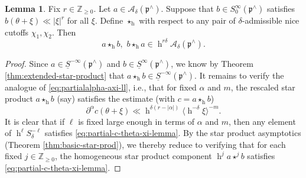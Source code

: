 \documentclass[reqno]{amsart}
\DeclareMathOperator{\h}{h}
\theoremstyle{plain} \newtheorem{theorem} {Theorem}
\theoremstyle{definition} \newtheorem{definition} [theorem] {Definition}
\theoremstyle{itplain} %
\newtheorem{lemma}[theorem]{Lemma}
\numberwithin{equation}{section}
\numberwithin{theorem}{section}
\renewcommand{\geq}{\geqslant}
\begin{document}
\begin{lemma}\label{lem:star-product-asymptotics-applied-to-cal-A-delta}
  Fix $r \in \mathbb{Z}_{\geq 0}$.  Let $a \in \mathcal{A}_\delta(\mathfrak{p}^\wedge)$.  Suppose that $b \in S^\infty_0(\mathfrak{p}^\wedge)$ satisfies $b(\theta + \xi) \ll |\xi|^r$ for all $\xi$.  Define $\star_{\h}$ with respect to any pair of $\delta$-admissible nice cutoffs $\chi_1, \chi_2$.  Then
  \begin{equation*}
    a \star_{\h} b, \, \, b \star_{\h} a \in \h^{r \delta} \mathcal{A}_\delta(\mathfrak{p}^\wedge).
  \end{equation*}
\end{lemma}
\begin{proof}
  Since $a \in \underline{S}^{-\infty}(\mathfrak{p}^\wedge)$ and $b \in \underline{S}^\infty(\mathfrak{p}^\wedge)$, we know by Theorem \ref{thm:extended-star-product} that $a \star_{\h} b \in \underline{S}^{-\infty}(\mathfrak{p}^\wedge)$.  It remains to verify the analogue of \eqref{eq:partialalpha-axi-ll}, i.e., that for fixed $\alpha$ and $m$, the rescaled star product $a \star_{\h} b$ (say) satisfies the estimate (with $c = a \star_{\h} b$)
  \begin{equation}\label{eq:partial-c-theta-xi-lemma}
    \partial^\alpha c(\theta + \xi) \ll \h^{\delta (r - |\alpha|)} \langle \h^{-\delta} \xi \rangle^{-m}.
  \end{equation}
  It is clear that if $\ell$ is fixed large enough in terms of $\alpha$ and $m$, then any element of $\h^\ell S_{\delta}^{-\ell}$ satisfies \eqref{eq:partial-c-theta-xi-lemma}.  By the star product asymptotics (Theorem \ref{thm:basic-star-prod}), we thereby reduce to verifying that for each fixed $j \in \mathbb{Z}_{\geq 0}$, the homogeneous star product component $\h^j a \star^j b$ satisfies \eqref{eq:partial-c-theta-xi-lemma}.


\end{proof}
\end{document}
